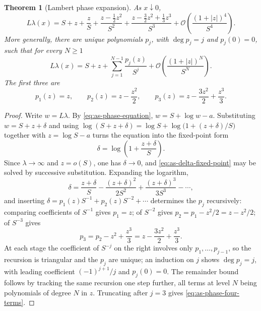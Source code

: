 \documentclass[11pt,oneside]{article}
\newtheorem{theorem}{Theorem}[section]
\theoremstyle{definition}
\theoremstyle{remark}
\newcommand{\bigO}{\mathcal O}
\newcommand{\smallo}{o}
\begin{document}
\begin{theorem}[Lambert phase expansion]
\label{thm:as-phase-expansion}
As $x\downarrow0$,
\begin{equation}
 L\lambda(x)=S+z+\frac{z}{S}
 +\frac{z-\tfrac12z^{2}}{S^{2}}
 +\frac{z-\tfrac32z^{2}+\tfrac13z^{3}}{S^{3}}
 +\bigO\!\left(\frac{(1+|z|)^{4}}{S^{4}}\right).          \label{eq:as-phase-four-terms}
\end{equation}
More generally, there are unique polynomials $p_j$, with $\deg p_j=j$ and $p_j(0)=0$, such
that for every $N\ge1$
\begin{equation}
 \boxed{
 L\lambda(x)=S+z+\sum_{j=1}^{N-1}\frac{p_j(z)}{S^{j}}
 +\bigO\!\left(\frac{(1+|z|)^{N}}{S^{N}}\right).}         \label{eq:as-phase-all-orders}
\end{equation}
The first three are
\begin{equation}
 p_1(z)=z,\qquad
 p_2(z)=z-\frac{z^{2}}{2},\qquad
 p_3(z)=z-\frac{3z^{2}}{2}+\frac{z^{3}}{3}.               \label{eq:as-phase-polynomials}
\end{equation}
\end{theorem}

\begin{proof}
Write $w=L\lambda$.  By \eqref{eq:as-phase-equation}, $w=S+\log w-a$.  Substituting
$w=S+z+\delta$ and using $\log(S+z+\delta)=\log S+\log\bigl(1+(z+\delta)/S\bigr)$ together
with $z=\log S-a$ turns the equation into the fixed-point form
\begin{equation}
 \delta=\log\left(1+\frac{z+\delta}{S}\right).            \label{eq:as-delta-fixed-point}
\end{equation}
Since $\lambda\to\infty$ and $z=\smallo(S)$, one has $\delta\to0$, and
\eqref{eq:as-delta-fixed-point} may be solved by successive substitution.  Expanding the
logarithm,
\begin{equation*}
 \delta=\frac{z+\delta}{S}-\frac{(z+\delta)^{2}}{2S^{2}}
 +\frac{(z+\delta)^{3}}{3S^{3}}-\cdots,
\end{equation*}
and inserting $\delta=p_1(z)S^{-1}+p_2(z)S^{-2}+\cdots$ determines the $p_j$ recursively:
comparing coefficients of $S^{-1}$ gives $p_1=z$; of $S^{-2}$ gives
$p_2=p_1-z^{2}/2=z-z^{2}/2$; of $S^{-3}$ gives
\begin{equation*}
 p_3=p_2-z^{2}+\frac{z^{3}}{3}=z-\frac{3z^{2}}{2}+\frac{z^{3}}{3}.
\end{equation*}
At each stage the coefficient of $S^{-j}$ on the right involves only $p_1,\ldots,p_{j-1}$, so
the recursion is triangular and the $p_j$ are unique; an induction on $j$ shows
$\deg p_j=j$, with leading coefficient $(-1)^{j+1}/j$ and $p_j(0)=0$.  The remainder bound
follows by tracking the same recursion one step further, all terms at level $N$ being
polynomials of degree $N$ in $z$.  Truncating after $j=3$ gives
\eqref{eq:as-phase-four-terms}.
\end{proof}
\end{document}
